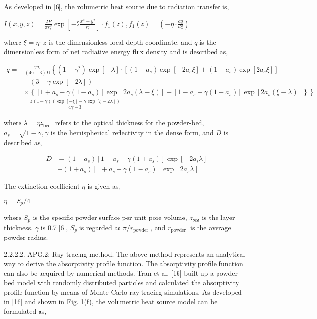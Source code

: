 \documentclass[10pt]{article}
\begin{document}
As developed in [6], the volumetric heat source due to radiation transfer is,

$I(x, y, z)=\frac{2 P}{\pi r_{l}^{2}} \exp \left[-2 \frac{x^{2}+y^{2}}{r_{l}^{2}}\right] \cdot f_{1}(z), f_{1}(z)=\left(-\eta \cdot \frac{d q}{d \xi}\right)$

where $\xi=\eta \cdot z$ is the dimensionless local depth coordinate, and $q$ is the dimensionless form of net radiative energy flux density and is described as,


\begin{align*}
q= & \frac{\gamma a_{s}}{(4 \gamma-3) D}\left\{\left(1-\gamma^{2}\right) \exp [-\lambda] \cdot\left[\left(1-a_{s}\right) \exp \left[-2 a_{s} \xi\right]+\left(1+a_{s}\right) \exp \left[2 a_{s} \xi\right]\right]\right. \\
& -(3+\gamma \exp [-2 \lambda]) \\
& \left.\times\left\{\left[1+a_{s}-\gamma\left(1-a_{s}\right)\right] \exp \left[2 a_{s}(\lambda-\xi)\right]+\left[1-a_{s}-\gamma\left(1+a_{s}\right)\right] \exp \left[2 a_{s}(\xi-\lambda)\right]\right\}\right\} \\
& -\frac{3(1-\gamma)(\exp [-\xi]-\gamma \exp [\xi-2 \lambda])}{4 \gamma-3} \tag{22}
\end{align*}


where $\lambda=\eta z_{\text {bed }}$ refers to the optical thickness for the powder-bed, $a_{s}=\sqrt{1-\gamma}, \gamma$ is the hemispherical reflectivity in the dense form, and $D$ is described as,


\begin{align*}
D & =\left(1-a_{s}\right)\left[1-a_{s}-\gamma\left(1+a_{s}\right)\right] \exp \left[-2 a_{s} \lambda\right] \\
& -\left(1+a_{s}\right)\left[1+a_{s}-\gamma\left(1-a_{s}\right)\right] \exp \left[2 a_{s} \lambda\right] \tag{23}
\end{align*}


The extinction coefficient $\eta$ is given as,

$\eta=S_{p} / 4$

where $S_{p}$ is the specific powder surface per unit pore volume, $z_{b e d}$ is the layer thickness. $\gamma$ is 0.7 [6], $S_{p}$ is regarded as $\pi / r_{\text {powder }}$, and $r_{\text {powder }}$ is the average powder radius.

2.2.2.2. APG.2: Ray-tracing method. The above method represents an analytical way to derive the absorptivity profile function. The absorptivity profile function can also be acquired by numerical methods. Tran et al. [16] built up a powder-bed model with randomly distributed particles and calculated the absorptivity profile function by means of Monte Carlo ray-tracing simulations. As developed in [16] and shown in Fig. 1(f), the volumetric heat source model can be formulated as,
\end{document}
